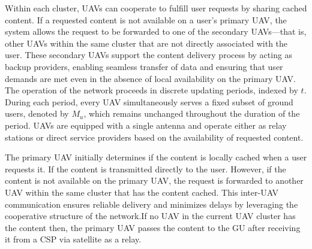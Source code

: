 \documentclass[journal]{IEEEtran}
\begin{document}
Within each cluster, UAVs can cooperate to fulfill user requests by sharing cached content. If a requested content is not available on a user's primary UAV, the system allows the request to be forwarded to one of the secondary UAVs—that is, other UAVs within the same cluster that are not directly associated with the user. These secondary UAVs support the content delivery process by acting as backup providers, enabling seamless transfer of data and ensuring that user demands are met even in the absence of local availability on the primary UAV.
The operation of the network proceeds in discrete updating periods, indexed by \( t \). During each period, every UAV simultaneously serves a fixed subset of ground users, denoted by \( M_u \), which remains unchanged throughout the duration of the period. UAVs are equipped with a single antenna and operate either as relay stations or direct service providers based on the availability of requested content.

The primary UAV initially determines if the content is locally cached when a user requests it. If  the content is transmitted directly to the user. However, if the content is not available on the primary UAV, the request is forwarded to another UAV within the same cluster that has the content cached. This inter-UAV communication ensures reliable delivery and minimizes delays by leveraging the cooperative structure of the network.If no UAV in the current UAV cluster has the content then, the primary UAV passes the content to the GU after receiving it from a CSP via satellite as a relay.
 
\end{document}
